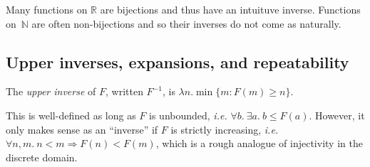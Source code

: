 Many functions on $\mathbb{R}$ are bijections and thus have an intuituve inverse.
Functions on~$\mathbb{N}$ are often non-bijections and so their inverses
do not come as naturally.

\subsection{Upper inverses, expansions, and repeatability}
\begin{defn} \label{defn: inverse}
The \emph{upper inverse} of $F$, written $F^{-1}$,
is $\lambda n. \min\{m : F(m)\ge n\}$.\end{defn}
This is well-defined as long as $F$ is unbounded,
\emph{i.e.} $\forall b.~\exists a.~ b \leq F(a)$.
However, it only makes sense as an ``inverse'' if $F$ is strictly
increasing, \emph{i.e.} $\forall n,m.~n < m \Rightarrow F(n) < F(m)$, which is
a rough analogue of injectivity in the discrete domain.

